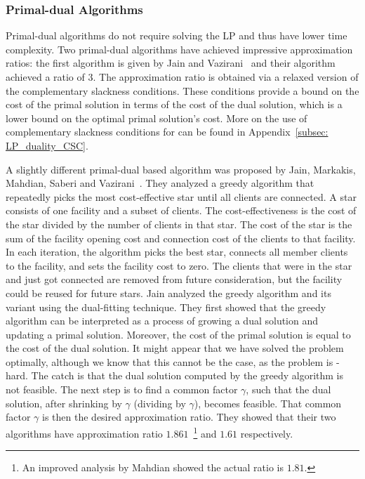 \documentclass[oneside,final]{ucr}
\begin{document}
\subsubsection{Primal-dual Algorithms}
Primal-dual algorithms do not require solving the LP and
thus have lower time complexity. Two primal-dual algorithms
have achieved impressive approximation ratios: the first
algorithm is given by Jain and Vazirani~\cite{JainV01} and
their algorithm achieved a ratio of $3$. The approximation
ratio is obtained via a relaxed version of the complementary
slackness conditions. These conditions provide a bound on
the cost of the primal solution in terms of the cost of the
dual solution, which is a lower bound on the optimal primal
solution's cost. More on the use of complementary slackness
conditions for {\UFL} can be found in Appendix~\ref{subsec:
  LP_duality_CSC}.

A slightly different primal-dual based algorithm was
proposed by Jain, Markakis, Mahdian, Saberi and
Vazirani~\cite{JainMMSV03}. They analyzed a greedy algorithm
that repeatedly picks the most cost-effective star until all
clients are connected. A star consists of one facility and a
subset of clients. The cost-effectiveness is the cost of the
star divided by the number of clients in that star. The cost
of the star is the sum of the facility opening cost and
connection cost of the clients to that facility. In each
iteration, the algorithm picks the best star, connects all
member clients to the facility, and sets the facility cost
to zero. The clients that were in the star and just got
connected are removed from future consideration, but the
facility could be reused for future stars. Jain {\etal}
analyzed the greedy algorithm and its variant using the
dual-fitting technique. They first showed that the greedy
algorithm can be interpreted as a process of growing a dual
solution and updating a primal solution. Moreover, the cost
of the primal solution is equal to the cost of the dual
solution. It might appear that we have solved the {\UFL}
problem optimally, although we know that this cannot be the
case, as the {\UFL} problem is {\NP}-hard. The catch is that
the dual solution computed by the greedy algorithm is not
feasible. The next step is to find a common factor $\gamma$,
such that the dual solution, after shrinking by $\gamma$
(dividing by $\gamma$), becomes feasible. That common factor
$\gamma$ is then the desired approximation ratio. They
showed that their two algorithms have approximation ratio
$1.861$~\footnote{An improved analysis by Mahdian showed the
  actual ratio is $1.81$.}  and $1.61$ respectively.
\end{document}
